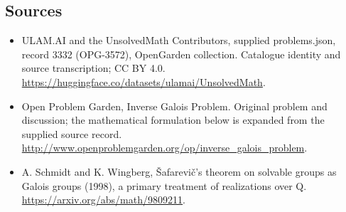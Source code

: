 \documentclass[11pt,a4paper]{article}
\begin{document}
\subsection{Sources}
\begin{itemize}
\item[S1] ULAM.AI and the UnsolvedMath Contributors, supplied problems.json, record 3332 (OPG-3572), OpenGarden collection. Catalogue identity and source transcription; CC BY 4.0.
\url{https://huggingface.co/datasets/ulamai/UnsolvedMath}.
\item[S2] Open Problem Garden, Inverse Galois Problem. Original problem and discussion; the mathematical formulation below is expanded from the supplied source record.
\url{http://www.openproblemgarden.org/op/inverse_galois_problem}.
\item[S3] A. Schmidt and K. Wingberg, Šafarevič’s theorem on solvable groups as Galois groups (1998), a primary treatment of realizations over Q.
\url{https://arxiv.org/abs/math/9809211}.
\end{itemize}
\end{document}
